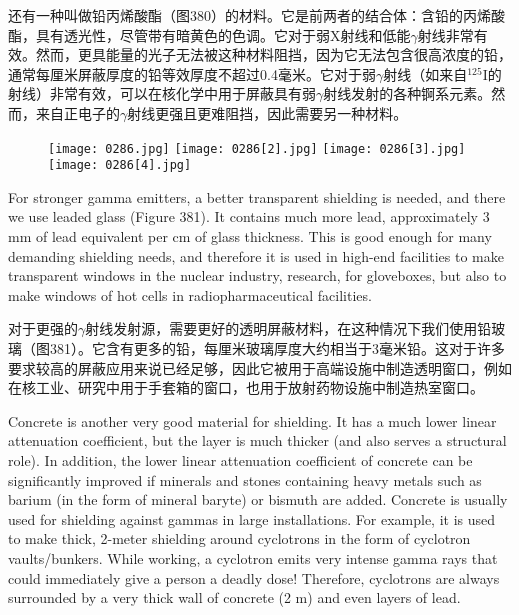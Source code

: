 \documentclass[dvipsnames, svgnames,a4paper,11pt]{article}
\begin{document}
还有一种叫做铅丙烯酸酯（图380）的材料。它是前两者的结合体：含铅的丙烯酸酯，具有透光性，尽管带有暗黄色的色调。它对于弱X射线和低能$\gamma$射线非常有效。然而，更具能量的光子无法被这种材料阻挡，因为它无法包含很高浓度的铅，通常每厘米屏蔽厚度的铅等效厚度不超过0.4毫米。它对于弱$\gamma$射线（如来自\(\mathrm{^{125}I}\)的射线）非常有效，可以在核化学中用于屏蔽具有弱$\gamma$射线发射的各种锕系元素。然而，来自正电子的$\gamma$射线更强且更难阻挡，因此需要另一种材料。

\begin{figure}[h]
    \centering
    \texttt{[image: 0286.jpg]} \hspace{0.1in}
    \texttt{[image: 0286[2].jpg]} \hspace{0.1in}
    \texttt{[image: 0286[3].jpg]}  \hspace{0.1in}
    \texttt{[image: 0286[4].jpg]}  
     \label{fig380}
\end{figure}

For stronger gamma emitters, a better transparent shielding is needed, and there we use leaded glass (Figure 381). It contains much more lead, approximately 3 mm of lead equivalent per cm of glass thickness. This is good enough for many demanding shielding needs, and therefore it is used in high-end facilities to make transparent windows in the nuclear industry, research, for gloveboxes, but also to make windows of hot cells in radiopharmaceutical facilities.

对于更强的$\gamma$射线发射源，需要更好的透明屏蔽材料，在这种情况下我们使用铅玻璃（图381）。它含有更多的铅，每厘米玻璃厚度大约相当于3毫米铅。这对于许多要求较高的屏蔽应用来说已经足够，因此它被用于高端设施中制造透明窗口，例如在核工业、研究中用于手套箱的窗口，也用于放射药物设施中制造热室窗口。

Concrete is another very good material for shielding. It has a much lower linear attenuation coefficient, but the layer is much thicker (and also serves a structural role). In addition, the lower linear attenuation coefficient of concrete can be significantly improved if minerals and stones containing heavy metals such as barium (in the form of mineral baryte) or bismuth are added. Concrete is usually used for shielding against gammas in large installations. For example, it is used to make thick, 2-meter shielding around cyclotrons in the form of cyclotron vaults/bunkers. While working, a cyclotron emits very intense gamma rays that could immediately give a person a deadly dose! Therefore, cyclotrons are always surrounded by a very thick wall of concrete (2 m) and even layers of lead.
\end{document}
